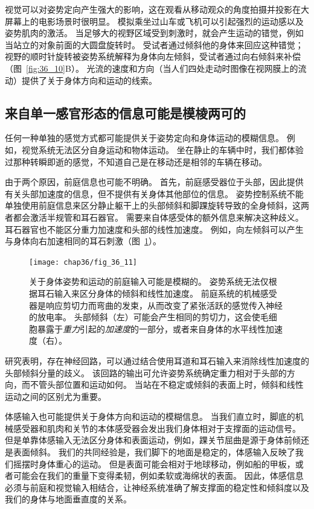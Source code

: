 视觉可以对姿势定向产生强大的影响，这在观看从移动观众的角度拍摄并投影在大屏幕上的电影场景时很明显。
模拟乘坐过山车或飞机可以引起强烈的运动感以及姿势肌肉的激活。
当足够大的视野区域受到刺激时，就会产生运动的错觉，例如当站立的对象前面的大圆盘旋转时。
受试者通过倾斜他的身体来回应这种错觉；
视野的顺时针旋转被姿势系统解释为身体向左倾斜，受试者通过向右倾斜来补偿（图~\ref{fig:36_10}B）。
光流的速度和方向（当人们四处走动时图像在视网膜上的流动）提供了关于身体方向和运动的线索。



\subsection{来自单一感官形态的信息可能是模棱两可的}

任何一种单独的感觉方式都可能提供关于姿势定向和身体运动的模糊信息。
例如，视觉系统无法区分自身运动和物体运动。
坐在静止的车辆中时，我们都体验过那种转瞬即逝的感觉，不知道自己是在移动还是相邻的车辆在移动。


由于两个原因，前庭信息也可能不明确。
首先，前庭感受器位于头部，因此提供有关头部加速度的信息，但不提供有关身体其他部位的信息。
姿势控制系统不能单独使用前庭信息来区分静止躯干上的头部倾斜和脚踝旋转导致的全身倾斜，这两者都会激活半规管和耳石器官。
需要来自体感受体的额外信息来解决这种歧义。
耳石器官也不能区分重力加速度和头部的线性加速度。 
例如，向左倾斜可以产生与身体向右加速相同的耳石刺激（图~\ref{fig:36_11}）。


\begin{figure}[htbp]
	\centering
	\texttt{[image: chap36/fig\_36\_11]}
	\caption{关于身体姿势和运动的前庭输入可能是模糊的。
		姿势系统无法仅根据耳石输入来区分身体的倾斜和线性加速度。
		前庭系统的机械感受器是响应剪切力而弯曲的发束，从而改变了紧张活跃的感觉传入神经的放电率。
		头部倾斜（左）可能会产生相同的剪切力，这会使毛细胞暴露于\textit{重力}引起的\textit{加速度}的一部分，或者来自身体的水平线性加速度（右）。}
	\label{fig:36_11}
\end{figure}


研究表明，存在神经回路，可以通过结合使用耳道和耳石输入来消除线性加速度的头部倾斜分量的歧义。
该回路的输出可允许姿势系统确定重力相对于头部的方向，而不管头部位置和运动如何。
当站在不稳定或倾斜的表面上时，倾斜和线性运动之间的区别尤为重要。


体感输入也可能提供关于身体方向和运动的模糊信息。
当我们直立时，脚底的机械感受器和肌肉和关节的本体感受器会发出我们身体相对于支撑面的运动信号。
但是单靠体感输入无法区分身体和表面运动，例如，踝关节屈曲是源于身体前倾还是表面倾斜。
我们的共同经验是，我们脚下的地面是稳定的，体感输入反映了我们摇摆时身体重心的运动。
但是表面可能会相对于地球移动，例如船的甲板，或者可能会在我们的重量下变得柔韧，例如柔软或海绵状的表面。
因此，体感信息必须与前庭和视觉输入相结合，让神经系统准确了解支撑面的稳定性和倾斜度以及我们的身体与地面垂直度的关系。



